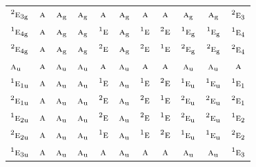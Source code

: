 \documentclass[10pt,a4paper]{article}
\numberwithin{equation}{section}
\newcommand{\irr}[1]{\text{\normalfont\scshape #1}}
\newcommand{\conjpair}[1]{{}^{#1}}
\newcommand{\ptag}[1]{\mathrm{#1}}
\begin{document}
{\begin{longtable}{@{}lcccccccccc@{}}
$\conjpair{2}\irr{e}_{3\ptag{g}}$ & $\irr{a}$ & $\irr{a}_{\ptag{g}}$ & $\irr{a}_{\ptag{g}}$ & $\irr{a}$ & $\irr{a}_{\ptag{g}}$ & $\irr{a}$ & $\irr{a}$ & $\irr{a}_{\ptag{g}}$ & $\irr{a}_{\ptag{g}}$ & $\conjpair{2}\irr{e}_{3}$\\
$\conjpair{1}\irr{e}_{4\ptag{g}}$ & $\irr{a}$ & $\irr{a}_{\ptag{g}}$ & $\irr{a}_{\ptag{g}}$ & $\conjpair{1}\irr{e}$ & $\irr{a}_{\ptag{g}}$ & $\conjpair{1}\irr{e}$ & $\conjpair{2}\irr{e}$ & $\conjpair{1}\irr{e}_{\ptag{g}}$ & $\conjpair{1}\irr{e}_{\ptag{g}}$ & $\conjpair{1}\irr{e}_{4}$\\
$\conjpair{2}\irr{e}_{4\ptag{g}}$ & $\irr{a}$ & $\irr{a}_{\ptag{g}}$ & $\irr{a}_{\ptag{g}}$ & $\conjpair{2}\irr{e}$ & $\irr{a}_{\ptag{g}}$ & $\conjpair{2}\irr{e}$ & $\conjpair{1}\irr{e}$ & $\conjpair{2}\irr{e}_{\ptag{g}}$ & $\conjpair{2}\irr{e}_{\ptag{g}}$ & $\conjpair{2}\irr{e}_{4}$\\
$\irr{a}_{\ptag{u}}$ & $\irr{a}$ & $\irr{a}_{\ptag{u}}$ & $\irr{a}_{\ptag{u}}$ & $\irr{a}$ & $\irr{a}_{\ptag{u}}$ & $\irr{a}$ & $\irr{a}$ & $\irr{a}_{\ptag{u}}$ & $\irr{a}_{\ptag{u}}$ & $\irr{a}$\\
$\conjpair{1}\irr{e}_{1\ptag{u}}$ & $\irr{a}$ & $\irr{a}_{\ptag{u}}$ & $\irr{a}_{\ptag{u}}$ & $\conjpair{1}\irr{e}$ & $\irr{a}_{\ptag{u}}$ & $\conjpair{1}\irr{e}$ & $\conjpair{2}\irr{e}$ & $\conjpair{1}\irr{e}_{\ptag{u}}$ & $\conjpair{1}\irr{e}_{\ptag{u}}$ & $\conjpair{1}\irr{e}_{1}$\\
$\conjpair{2}\irr{e}_{1\ptag{u}}$ & $\irr{a}$ & $\irr{a}_{\ptag{u}}$ & $\irr{a}_{\ptag{u}}$ & $\conjpair{2}\irr{e}$ & $\irr{a}_{\ptag{u}}$ & $\conjpair{2}\irr{e}$ & $\conjpair{1}\irr{e}$ & $\conjpair{2}\irr{e}_{\ptag{u}}$ & $\conjpair{2}\irr{e}_{\ptag{u}}$ & $\conjpair{2}\irr{e}_{1}$\\
$\conjpair{1}\irr{e}_{2\ptag{u}}$ & $\irr{a}$ & $\irr{a}_{\ptag{u}}$ & $\irr{a}_{\ptag{u}}$ & $\conjpair{2}\irr{e}$ & $\irr{a}_{\ptag{u}}$ & $\conjpair{2}\irr{e}$ & $\conjpair{1}\irr{e}$ & $\conjpair{2}\irr{e}_{\ptag{u}}$ & $\conjpair{2}\irr{e}_{\ptag{u}}$ & $\conjpair{1}\irr{e}_{2}$\\
$\conjpair{2}\irr{e}_{2\ptag{u}}$ & $\irr{a}$ & $\irr{a}_{\ptag{u}}$ & $\irr{a}_{\ptag{u}}$ & $\conjpair{1}\irr{e}$ & $\irr{a}_{\ptag{u}}$ & $\conjpair{1}\irr{e}$ & $\conjpair{2}\irr{e}$ & $\conjpair{1}\irr{e}_{\ptag{u}}$ & $\conjpair{1}\irr{e}_{\ptag{u}}$ & $\conjpair{2}\irr{e}_{2}$\\
$\conjpair{1}\irr{e}_{3\ptag{u}}$ & $\irr{a}$ & $\irr{a}_{\ptag{u}}$ & $\irr{a}_{\ptag{u}}$ & $\irr{a}$ & $\irr{a}_{\ptag{u}}$ & $\irr{a}$ & $\irr{a}$ & $\irr{a}_{\ptag{u}}$ & $\irr{a}_{\ptag{u}}$ & $\conjpair{1}\irr{e}_{3}$\\

\end{longtable}}
\end{document}
